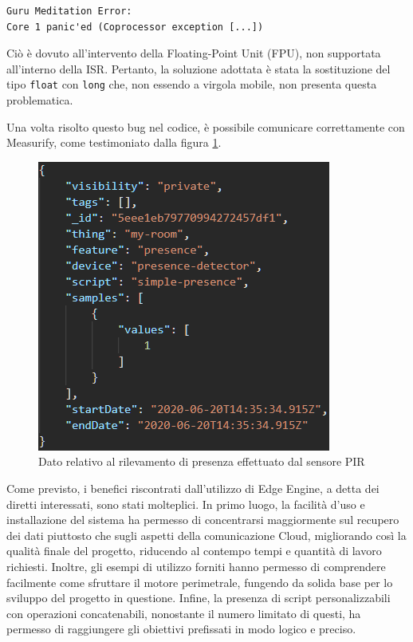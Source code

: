 \begin{verbatim}
Guru Meditation Error: 
Core 1 panic'ed (Coprocessor exception [...])
\end{verbatim}

Ciò è dovuto all'intervento della Floating-Point Unit (FPU), non supportata all'interno della ISR. Pertanto, la soluzione adottata è stata la sostituzione del tipo \texttt{float} con \texttt{long} che, non essendo a virgola mobile, non presenta questa problematica.

Una volta risolto questo bug nel codice, è possibile comunicare correttamente con Measurify, come testimoniato dalla figura \ref{measacquario}.

\begin{figure}[H]
	\centering
	\includegraphics[width=0.6\linewidth]{pics/measacquario}
	\caption{Dato relativo al rilevamento di presenza effettuato dal sensore PIR}
	\label{measacquario}
\end{figure}

Come previsto, i benefici riscontrati dall'utilizzo di Edge Engine, a detta dei diretti interessati, sono stati molteplici. In primo luogo, la facilità d'uso e installazione del sistema ha permesso di concentrarsi maggiormente sul recupero dei dati piuttosto che sugli aspetti della comunicazione Cloud, migliorando così la qualità finale del progetto, riducendo al contempo tempi e quantità di lavoro richiesti. Inoltre, gli esempi di utilizzo forniti hanno permesso di comprendere facilmente come sfruttare il motore perimetrale, fungendo da solida base per lo sviluppo del progetto in questione. Infine, la presenza di script personalizzabili con operazioni concatenabili, nonostante il numero limitato di questi, ha permesso di raggiungere gli obiettivi prefissati in modo logico e preciso.

